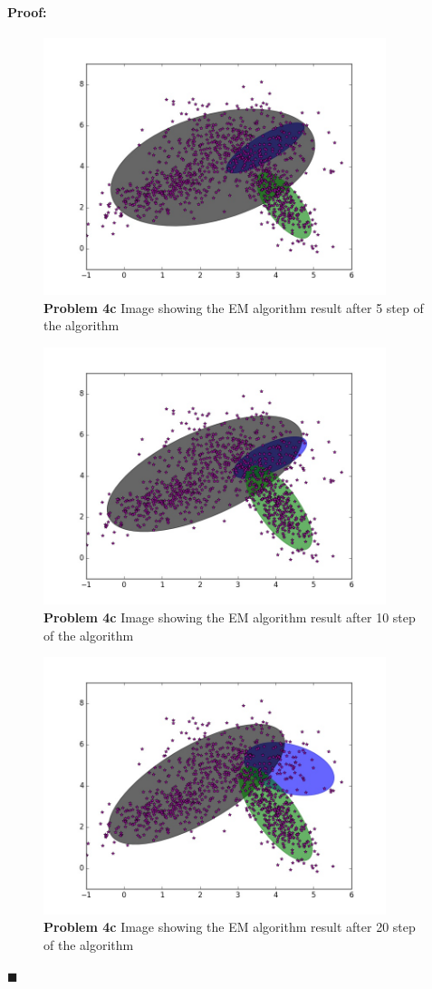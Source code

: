 \documentclass[12pt]{article}
\newenvironment{proof}{\paragraph{Proof: }}{\hfill$\blacksquare$}
\begin{document}
\begin{proof}
\begin{enumerate}
\begin{figure}[!htbp]
\centering
\includegraphics[width = 10cm]{prob4c_5_random_2.jpg}
\caption{\textbf{Problem 4c} Image showing the EM algorithm result after 5 step of the algorithm}
\end{figure}

\begin{figure}[!htbp]
\centering
\includegraphics[width = 10cm]{prob4c_10_random_2.jpg}
\caption{\textbf{Problem 4c} Image showing the EM algorithm result after 10 step of the algorithm}
\end{figure}

\begin{figure}[!htbp]
\centering
\includegraphics[width = 10cm]{prob4c_20_random_2.jpg}
\caption{\textbf{Problem 4c} Image showing the EM algorithm result after 20 step of the algorithm}
\end{figure}


\end{enumerate}
\end{proof}
\end{document}
